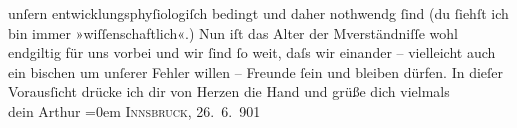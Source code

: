 \begin{ledgroupsized}[t]{13cm}
               unſern entwicklungsphyſiologiſch bedingt und daher nothwendg ſind (du ſiehſt ich bin
               immer »wiſſenschaftlich«.) Nun iſt das Alter der Mverständniſſe wohl endgiltig für uns vorbei und wir ſind ſo weit, daſs wir
               einander – vielleicht auch ein bischen um unſerer Fehler willen – Freunde ſein und
                  {\pb}bleiben dürfen.\pend
           \pstart
           In dieſer Vorausſicht drücke ich dir von Herzen die Hand und grüße dich
               vielmals{\\[\baselineskip]} dein \spacefill\mbox{Arthur}\pend
           \leftskip=0em{}\pstart
           \textsc{Innsbruck}, 26. 6. 901\pend
           
         
         \endnumbering{}\end{ledgroupsized}  \newcommand{\dateiname}{L01134}\newcommand{\titel}{Arthur Schnitzler an Hermann Bahr, 26. 6. 1901}\newcommand{\editorInnen}{ Kurt Ifkovits,  Martin Anton Müller}
      